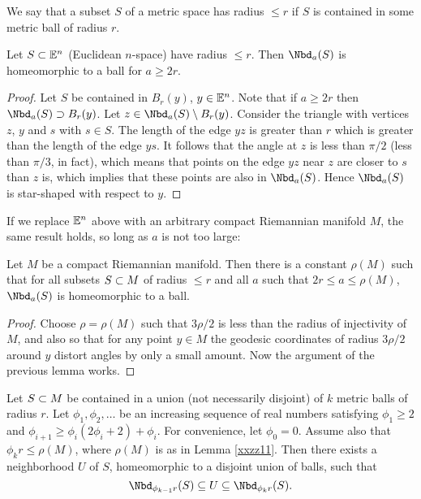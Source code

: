 We say that a subset $S$ of a metric space has radius $\le r$ if $S$ is contained in
some metric ball of radius $r$.

\begin{lemma}
Let $S \subset \mathbb{E}^n$ (Euclidean $n$-space) have radius $\le r$.  
Then $\Nbd_a(S)$ is homeomorphic to a ball for $a \ge 2r$.
\end{lemma}

\begin{proof} \label{xxyy2}
Let $S$ be contained in $B_r(y)$, $y \in \mathbb{E}^n$.
Note that if $a \ge 2r$ then $\Nbd_a(S) \sup B_r(y)$.
Let $z\in \Nbd_a(S) \setmin B_r(y)$.
Consider the triangle
 with vertices $z$, $y$ and $s$ with $s\in S$.
The length of the edge $yz$ is greater than $r$ which is greater
than the length of the edge $ys$.
It follows that the angle at $z$ is less than $\pi/2$ (less than $\pi/3$, in fact),
which means that points on the edge $yz$ near $z$ are closer to $s$ than $z$ is,
which implies that these points are also in $\Nbd_a(S)$.
Hence $\Nbd_a(S)$ is star-shaped with respect to $y$.
\end{proof}

If we replace $\mathbb{E}^n$ above with an arbitrary compact Riemannian manifold $M$,
the same result holds, so long as $a$ is not too large:

\begin{lemma} \label{xxzz11}
Let $M$ be a compact Riemannian manifold.
Then there is a constant $\rho(M)$ such that for all
subsets $S\subset M$ of radius $\le r$ and all $a$ such that $2r \le a \le \rho(M)$,
$\Nbd_a(S)$ is homeomorphic to a ball.
\end{lemma}

\begin{proof}
Choose $\rho = \rho(M)$ such that $3\rho/2$ is less than the radius of injectivity of $M$,
and also so that for any point $y\in M$ the geodesic coordinates of radius $3\rho/2$ around
$y$ distort angles by only a small amount.
Now the argument of the previous lemma works.
\end{proof}



\begin{lemma} \label{xx2phi}
Let $S \subset M$ be contained in a union (not necessarily disjoint)
of $k$ metric balls of radius $r$.
Let $\phi_1, \phi_2, \ldots$ be an increasing sequence of real numbers satisfying
$\phi_1 \ge 2$ and $\phi_{i+1} \ge \phi_i(2\phi_i + 2) + \phi_i$.
For convenience, let $\phi_0 = 0$.
Assume also that $\phi_k r \le \rho(M)$,
where $\rho(M)$ is as in Lemma \ref{xxzz11}.
Then there exists a neighborhood $U$ of $S$,
homeomorphic to a disjoint union of balls, such that
\[
	\Nbd_{\phi_{k-1} r}(S) \subeq U \subeq \Nbd_{\phi_k r}(S) .
\]
\end{lemma}

